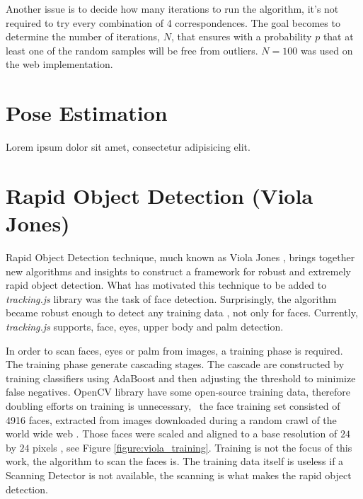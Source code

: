 Another issue is to decide how many iterations to run the algorithm, it's not required to try every combination of 4 correspondences. The goal becomes to determine the number of iterations, $N$, that ensures with a probability $p$ that at least one of the random samples will be free from outliers. $N=100$ was used on the web implementation.

\label{sec:ar_library_for_the_web:ransac}


\section{Pose Estimation} %
\label{sec:ar_library_for_the_web:pose_estimation}

Lorem ipsum dolor sit amet, consectetur adipisicing elit.


\section{Rapid Object Detection (Viola Jones)} %
\label{sec:ar_library_for_the_web:rapid_object_detection}

Rapid Object Detection \cite{Viola2001} technique, much known as Viola Jones \cite{Viola2001}, brings together new algorithms and insights to construct a framework for robust and extremely rapid object detection. What has motivated this technique to be added to \textit{tracking.js} library was the task of face detection. Surprisingly, the algorithm became robust enough to detect any training data \cite{Viola2001}, not only for faces. Currently, \textit{tracking.js} supports, face, eyes, upper body and palm detection.

In order to scan faces, eyes or palm from images, a training phase is required. The training phase generate cascading stages. The cascade are constructed by training classifiers using AdaBoost \cite{Viola2001} and then adjusting the threshold to minimize false negatives. OpenCV library \cite{Bradski2000} have some open-source training data, therefore doubling efforts on training is unnecessary, \ie\ the face training set consisted of 4916 faces, extracted from images downloaded during a random crawl of the world wide web \cite{Viola2001}. Those faces were scaled and aligned to a base resolution of $24$ by $24$ pixels \cite{Viola2001}, see Figure \ref{figure:viola_training}. Training is not the focus of this work, the algorithm to scan the faces is. The training data itself is useless if a Scanning Detector \cite{Viola2001} is not available, the scanning is what makes the rapid object detection.

